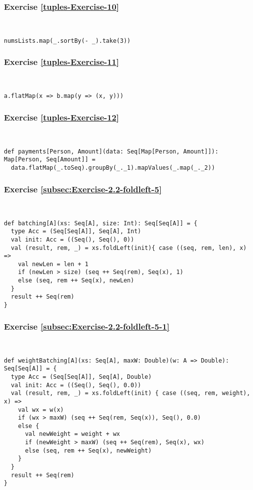 \subsubsection*{Exercise \ref{tuples-Exercise-10}}

~
\begin{lstlisting}
numsLists.map(_.sortBy(- _).take(3))
\end{lstlisting}


\subsubsection*{Exercise \ref{tuples-Exercise-11}}

~
\begin{lstlisting}
a.flatMap(x => b.map(y => (x, y)))
\end{lstlisting}


\subsubsection*{Exercise \ref{tuples-Exercise-12}}

~
\begin{lstlisting}
def payments[Person, Amount](data: Seq[Map[Person, Amount]]): Map[Person, Seq[Amount]] =
  data.flatMap(_.toSeq).groupBy(_._1).mapValues(_.map(_._2))
\end{lstlisting}


\subsubsection*{Exercise \ref{subsec:Exercise-2.2-foldleft-5}}

~
\begin{lstlisting}
def batching[A](xs: Seq[A], size: Int): Seq[Seq[A]] = {  
  type Acc = (Seq[Seq[A]], Seq[A], Int)
  val init: Acc = ((Seq(), Seq(), 0))
  val (result, rem, _) = xs.foldLeft(init){ case ((seq, rem, len), x) =>
    val newLen = len + 1
    if (newLen > size) (seq ++ Seq(rem), Seq(x), 1)
    else (seq, rem ++ Seq(x), newLen)
  }
  result ++ Seq(rem)
}
\end{lstlisting}


\subsubsection*{Exercise \ref{subsec:Exercise-2.2-foldleft-5-1}}

~
\begin{lstlisting}
def weightBatching[A](xs: Seq[A], maxW: Double)(w: A => Double): Seq[Seq[A]] = {  
  type Acc = (Seq[Seq[A]], Seq[A], Double)
  val init: Acc = ((Seq(), Seq(), 0.0))
  val (result, rem, _) = xs.foldLeft(init) { case ((seq, rem, weight), x) =>
    val wx = w(x)
    if (wx > maxW) (seq ++ Seq(rem, Seq(x)), Seq(), 0.0)
    else {
      val newWeight = weight + wx
      if (newWeight > maxW) (seq ++ Seq(rem), Seq(x), wx)
      else (seq, rem ++ Seq(x), newWeight)
    }
  }
  result ++ Seq(rem)
}
\end{lstlisting}


